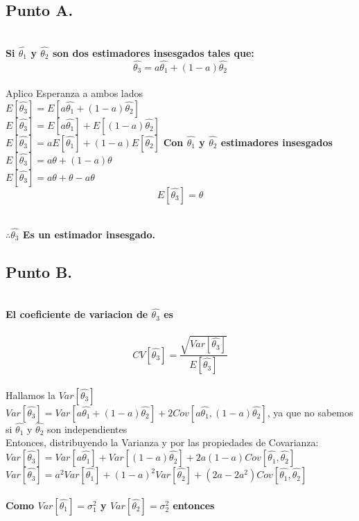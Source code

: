 \documentclass[letterpaper,12pt,onecolumn,titlepage]{article}
\begin{document}
\subsection{Punto A.}
~\\\textbf{Si $\hat{\theta_1}$ y $\hat{\theta_2}$ son dos estimadores insesgados tales que:
~\\$$\hat{\theta_3}=a{\hat{\theta_1}}+(1-a){\hat{\theta_2}}$$}
~\\ Aplico Esperanza a ambos lados 
~\\ $E[\hat{\theta_3}] = E[a{\hat{\theta_1}}+(1-a){\hat{\theta_2}}]$
~\\ $E[\hat{\theta_3}] = E[a{\hat{\theta_1}}]+E[(1-a){\hat{\theta_2}}]$
~\\ $E[\hat{\theta_3}] = aE[{\hat{\theta_1}}]+(1-a)E[{\hat{\theta_2}}]$ \textbf{Con $\hat{\theta_1}$ y $\hat{\theta_2}$ estimadores insesgados}\
~\\ $E[\hat{\theta_3}] = a{\theta} + (1-a){\theta}$
~\\ $E[\hat{\theta_3}] = a{\theta} + {\theta} - a{\theta}$
~\\ $$E[\hat{\theta_3}]={\theta}$$

~\\\textbf{$\therefore \hat{\theta_3}$ Es un estimador insesgado.} 
 


\subsection{Punto B.} 

~\\\textbf{ El coeficiente de variacion de $\hat{\theta_3}$ es}
~\\
~\\ $$CV[\hat{\theta_3}]=\frac{\sqrt{Var[\hat{\theta_3}]}}{E[\hat{\theta_3}]}$$
~\\ Hallamos la $Var[\hat{\theta_3}]$
~\\ $Var[\hat{\theta_3}]=Var[a{\hat{\theta_1}}+(1-a){\hat{\theta_2}}]+2Cov[a{\hat{\theta_1}},(1-a){\hat{\theta_2}}]$,    ya que no sabemos si ${\hat{\theta_1}}$ y ${\hat{\theta_2}}$ son independientes
~\\ Entonces, distribuyendo la Varianza y por las propiedades de Covarianza:
~\\ $Var[\hat{\theta_3}]=Var[a{\hat{\theta_1}}]+Var[(1-a){\hat{\theta_2}}]+2a(1-a) Cov[{\hat{\theta_1}},{\hat{\theta_2}}]$
~\\ $Var[\hat{\theta_3}]=a^2Var[{\hat{\theta_1}}]+(1-a)^2Var[{\hat{\theta_2}}]+(2a-2a^2)Cov[{\hat{\theta_1}},{\hat{\theta_2}}]$
~\\
~\\\textbf{Como $Var[{\hat{\theta_1}}]=\sigma_1^2$ y $Var[{\hat{\theta_2}}]=\sigma_2^2$ entonces}
\end{document}
